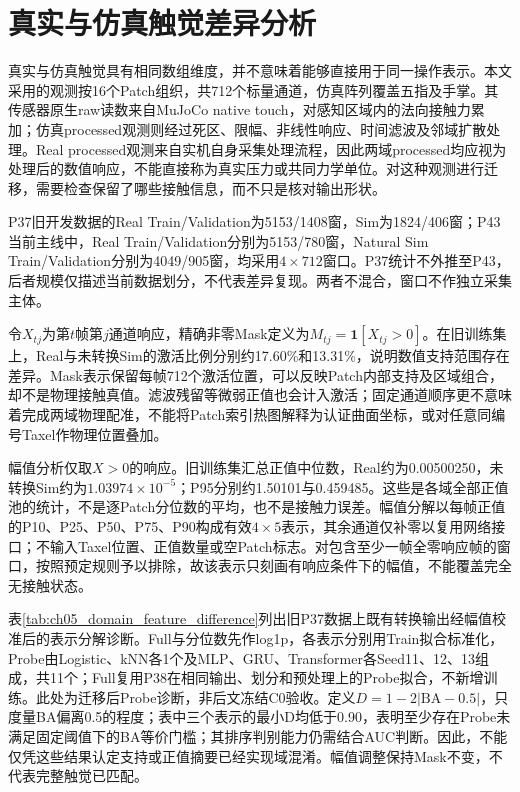 \section{真实与仿真触觉差异分析}
\label{sec:ch05_real_sim_difference}

真实与仿真触觉具有相同数组维度，并不意味着能够直接用于同一操作表示。本文采用的观测按16个Patch组织，共712个标量通道，仿真阵列覆盖五指及手掌。其传感器原生raw读数来自MuJoCo native touch，对感知区域内的法向接触力累加\cite{mujoco2026xml}；仿真processed观测则经过死区、限幅、非线性响应、时间滤波及邻域扩散处理。Real processed观测来自实机自身采集处理流程，因此两域processed均应视为处理后的数值响应，不能直接称为真实压力或共同力学单位。对这种观测进行迁移，需要检查保留了哪些接触信息，而不只是核对输出形状。

P37旧开发数据的Real Train/Validation为5153/1408窗，Sim为1824/406窗；P43当前主线中，Real Train/Validation分别为5153/780窗，Natural Sim Train/Validation分别为4049/905窗，均采用$4\times712$窗口。P37统计不外推至P43，后者规模仅描述当前数据划分，不代表差异复现。两者不混合，窗口不作独立采集主体。

令$X_{tj}$为第$t$帧第$j$通道响应，精确非零Mask定义为$M_{tj}=\mathbf1[X_{tj}>0]$。在旧训练集上，Real与未转换Sim的激活比例分别约17.60\%和13.31\%，说明数值支持范围存在差异。Mask表示保留每帧712个激活位置，可以反映Patch内部支持及区域组合，却不是物理接触真值。滤波残留等微弱正值也会计入激活；固定通道顺序更不意味着完成两域物理配准，不能将Patch索引热图解释为认证曲面坐标，或对任意同编号Taxel作物理位置叠加。

幅值分析仅取$X>0$的响应。旧训练集汇总正值中位数，Real约为0.00500250，未转换Sim约为$1.03974\times10^{-5}$；P95分别约1.50101与0.459485。这些是各域全部正值池的统计，不是逐Patch分位数的平均，也不是接触力误差。幅值分解以每帧正值的P10、P25、P50、P75、P90构成有效$4\times5$表示，其余通道仅补零以复用网络接口；不输入Taxel位置、正值数量或空Patch标志。对包含至少一帧全零响应帧的窗口，按照预定规则予以排除，故该表示只刻画有响应条件下的幅值，不能覆盖完全无接触状态。

表\ref{tab:ch05_domain_feature_difference}列出旧P37数据上既有转换输出经幅值校准后的表示分解诊断。Full与分位数先作log1p，各表示分别用Train拟合标准化，Probe由Logistic、kNN各1个及MLP、GRU、Transformer各Seed11、12、13组成，共11个；Full复用P38在相同输出、划分和预处理上的Probe拟合，不新增训练。此处为迁移后Probe诊断，非后文冻结C0验收。定义$D=1-2|\mathrm{BA}-0.5|$，只度量BA偏离0.5的程度；表中三个表示的最小D均低于0.90，表明至少存在Probe未满足固定阈值下的BA等价门槛；其排序判别能力仍需结合AUC判断。因此，不能仅凭这些结果认定支持或正值摘要已经实现域混淆。幅值调整保持Mask不变，不代表完整触觉已匹配。

